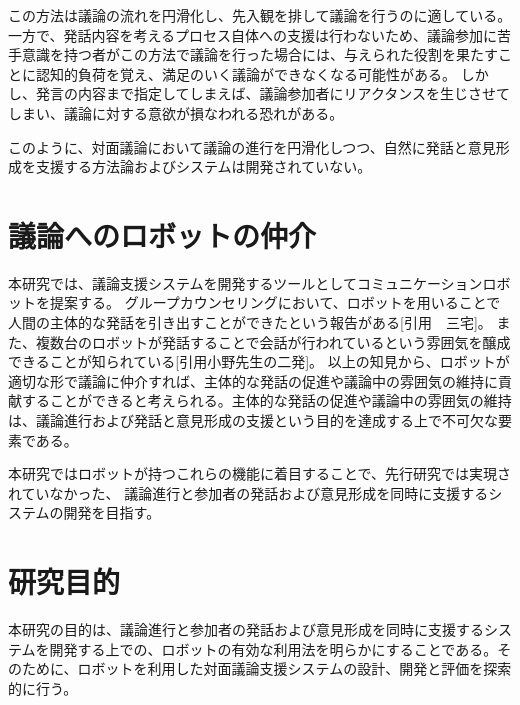 \documentclass[11pt, a4paper]{jreport} %
\begin{document}
この方法は議論の流れを円滑化し、先入観を排して議論を行うのに適している。一方で、発話内容を考えるプロセス自体への支援は行わないため、議論参加に苦手意識を持つ者がこの方法で議論を行った場合には、与えられた役割を果たすことに認知的負荷を覚え、満足のいく議論ができなくなる可能性がある。
しかし、発言の内容まで指定してしまえば、議論参加者にリアクタンス\cite{Brehm1989PsychologicalRT}を生じさせてしまい、議論に対する意欲が損なわれる恐れがある。


このように、対面議論において議論の進行を円滑化しつつ、自然に発話と意見形成を支援する方法論およびシステムは開発されていない。

\section{議論へのロボットの仲介}
本研究では、議論支援システムを開発するツールとしてコミュニケーションロボットを提案する。
グループカウンセリングにおいて、ロボットを用いることで人間の主体的な発話を引き出すことができたという報告がある[引用　三宅]。
また、複数台のロボットが発話することで会話が行われているという雰囲気を醸成できることが知られている[引用小野先生の二発]。
以上の知見から、ロボットが適切な形で議論に仲介すれば、主体的な発話の促進や議論中の雰囲気の維持に貢献することができると考えられる。主体的な発話の促進や議論中の雰囲気の維持は、議論進行および発話と意見形成の支援という目的を達成する上で不可欠な要素である。	



本研究ではロボットが持つこれらの機能に着目することで、先行研究では実現されていなかった、
議論進行と参加者の発話および意見形成を同時に支援するシステムの開発を目指す。


\section{研究目的}
本研究の目的は、議論進行と参加者の発話および意見形成を同時に支援するシステムを開発する上での、ロボットの有効な利用法を明らかにすることである。そのために、ロボットを利用した対面議論支援システムの設計、開発と評価を探索的に行う。
\end{document}
